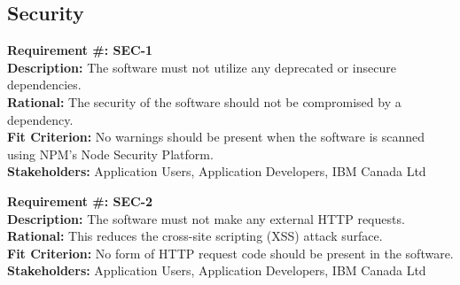 \documentclass[12pt, titlepage]{article}
\begin{document}
\subsection{Security}
\begin{flushleft}
\textbf{Requirement \#: SEC-1} \\
\textbf{Description:} The software must not utilize any deprecated or insecure dependencies. \\
\textbf{Rational:} The security of the software should not be compromised by a dependency. \\
\textbf{Fit Criterion:} No warnings should be present when the software is scanned using NPM's Node Security Platform. \\
\textbf{Stakeholders:} Application Users, Application Developers, IBM Canada Ltd \\
\end{flushleft}
\begin{flushleft}
\textbf{Requirement \#: SEC-2} \\
\textbf{Description:} The software must not make any external HTTP requests. \\
\textbf{Rational:} This reduces the cross-site scripting (XSS) attack surface. \\
\textbf{Fit Criterion:} No form of HTTP request code should be present in the software. \\
\textbf{Stakeholders:} Application Users, Application Developers, IBM Canada Ltd \\
\end{flushleft}
\end{document}
